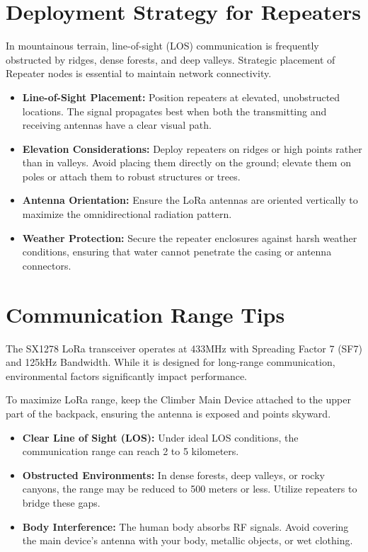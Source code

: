 \section{Deployment Strategy for Repeaters}
\label{sec:repeater-deployment}

In mountainous terrain, line-of-sight (LOS) communication is frequently obstructed by ridges, dense forests, and deep valleys. Strategic placement of Repeater nodes is essential to maintain network connectivity.

\begin{itemize}
    \item \textbf{Line-of-Sight Placement:} Position repeaters at elevated, unobstructed locations. The signal propagates best when both the transmitting and receiving antennas have a clear visual path.
    \item \textbf{Elevation Considerations:} Deploy repeaters on ridges or high points rather than in valleys. Avoid placing them directly on the ground; elevate them on poles or attach them to robust structures or trees.
    \item \textbf{Antenna Orientation:} Ensure the LoRa antennas are oriented vertically to maximize the omnidirectional radiation pattern.
    \item \textbf{Weather Protection:} Secure the repeater enclosures against harsh weather conditions, ensuring that water cannot penetrate the casing or antenna connectors.
\end{itemize}

\section{Communication Range Tips}
\label{sec:comm-range-tips}

The SX1278 LoRa transceiver operates at 433MHz with Spreading Factor 7 (SF7) and 125kHz Bandwidth. While it is designed for long-range communication, environmental factors significantly impact performance.

\begin{tipbox}
To maximize LoRa range, keep the Climber Main Device attached to the upper part of the backpack, ensuring the antenna is exposed and points skyward.
\end{tipbox}

\begin{itemize}
    \item \textbf{Clear Line of Sight (LOS):} Under ideal LOS conditions, the communication range can reach 2 to 5 kilometers.
    \item \textbf{Obstructed Environments:} In dense forests, deep valleys, or rocky canyons, the range may be reduced to 500 meters or less. Utilize repeaters to bridge these gaps.
    \item \textbf{Body Interference:} The human body absorbs RF signals. Avoid covering the main device's antenna with your body, metallic objects, or wet clothing.
\end{itemize}

